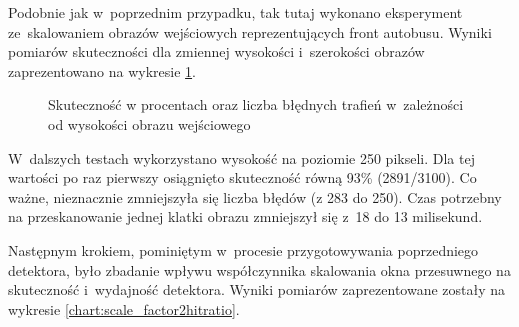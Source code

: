 Podobnie jak w~poprzednim przypadku, tak tutaj wykonano eksperyment
ze~skalowaniem obrazów wejściowych reprezentujących front autobusu.
Wyniki pomiarów skuteczności dla zmiennej wysokości i~szerokości
obrazów zaprezentowano na wykresie \ref{chart:front_height2hitratio}.

\begin{figure}[h!]
	\begin{center}
	\end{center}
	\caption{Skuteczność w procentach oraz liczba błędnych trafień 
		w~zależności od wysokości obrazu wejściowego}
	\label{chart:front_height2hitratio}
\end{figure}

W~dalszych testach wykorzystano wysokość na poziomie 250 pikseli. 
Dla tej wartości po raz pierwszy osiągnięto skuteczność równą 93\% (2891/3100).
Co ważne, nieznacznie zmniejszyła się liczba błędów (z 283 do 250). 
Czas potrzebny na przeskanowanie jednej klatki obrazu
zmniejszył się z~18 do 13 milisekund.

Następnym krokiem, pominiętym w~procesie przygotowywania poprzedniego
detektora, było zbadanie wpływu współczynnika skalowania okna przesuwnego
na skuteczność i~wydajność detektora. Wyniki pomiarów zaprezentowane
zostały na wykresie \ref{chart:scale_factor2hitratio}.

